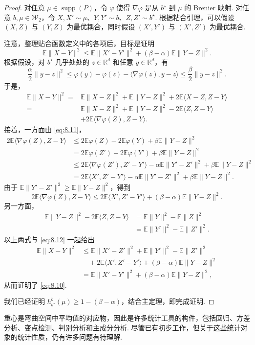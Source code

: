 \begin{proof}
对任意 $\mu\in\operatorname{supp}(P)$，令 $\varphi$ 使得 $\nabla\varphi$ 是从 $b^\star$ 到 $\mu$ 的 Brenier 映射. 对任意 $b,\mu\in\mathcal W_2$，令 $X,X'\sim\mu$、$Y,Y'\sim b$、$Z,Z'\sim b^\star$. 根据粘合引理，可以假设 $(X,Z)$ 与 $(Y,Z)$ 为最优耦合，同时假设 $(X',Y')$ 与 $(X',Z')$ 为最优耦合.

注意，整理贴合函数定义中的各项后，目标是证明
\begin{equation}\label{eq:8.10}
\mathbb E\|X-Y\|^2\le\mathbb E\|X'-Y'\|^2+(\beta-\alpha)\mathbb E\|Y-Z\|^2.
\end{equation}
根据假设，对 $b^\star$ 几乎处处的 $z\in\mathbb R^d$ 和任意 $y\in\mathbb R^d$，有
\begin{equation}\label{eq:8.11}
\frac\alpha2\|y-z\|^2
\le\varphi(y)-\varphi(z)-\langle\nabla\varphi(z),y-z\rangle
\le\frac\beta2\|y-z\|^2.
\end{equation}
于是，
\begin{equation}\label{eq:8.12}
\begin{aligned}
\mathbb E\|X-Y\|^2
={}&\mathbb E\|X-Z\|^2+\mathbb E\|Y-Z\|^2
+2\mathbb E\langle X-Z,Z-Y\rangle\\
={}&\mathbb E\|X-Z\|^2+\mathbb E\|Y-Z\|^2
-2\mathbb E\langle Z,Z-Y\rangle\\
&+2\mathbb E\langle\nabla\varphi(Z),Z-Y\rangle.
\end{aligned}
\end{equation}
接着，一方面由 \eqref{eq:8.11}，
$$\begin{aligned}
2\mathbb E\langle\nabla\varphi(Z),Z-Y\rangle
&\le2\mathbb E\varphi(Z)-2\mathbb E\varphi(Y)+\beta\mathbb E\|Y-Z\|^2\\
&=2\mathbb E\varphi(Z')-2\mathbb E\varphi(Y')+\beta\mathbb E\|Y-Z\|^2\\
&\le2\mathbb E\langle\nabla\varphi(Z'),Z'-Y'\rangle
-\alpha\mathbb E\|Y'-Z'\|^2+\beta\mathbb E\|Y-Z\|^2\\
&=2\mathbb E\langle X',Z'-Y'\rangle
-\alpha\mathbb E\|Y'-Z'\|^2+\beta\mathbb E\|Y-Z\|^2.
\end{aligned}$$
由于 $\mathbb E\|Y'-Z'\|^2\ge\mathbb E\|Y-Z\|^2$，得到
$$2\mathbb E\langle\nabla\varphi(Z),Z-Y\rangle
\le2\mathbb E\langle X',Z'-Y'\rangle+(\beta-\alpha)\mathbb E\|Y-Z\|^2.$$
另一方面，
$$\begin{aligned}
\mathbb E\|Y-Z\|^2-2\mathbb E\langle Z,Z-Y\rangle
&=\mathbb E\|Y\|^2-\mathbb E\|Z\|^2\\
&=\mathbb E\|Y'\|^2-\mathbb E\|Z'\|^2.
\end{aligned}$$
以上两式与 \eqref{eq:8.12} 一起给出
$$\begin{aligned}
\mathbb E\|X-Y\|^2
&\le\mathbb E\|X'-Z'\|^2+\mathbb E\|Y'\|^2-\mathbb E\|Z'\|^2\\
&\quad+2\mathbb E\langle X',Z'-Y'\rangle+(\beta-\alpha)\mathbb E\|Y-Z\|^2\\
&=\mathbb E\|X'-Y'\|^2+(\beta-\alpha)\mathbb E\|Y-Z\|^2,
\end{aligned}$$
从而证明了 \eqref{eq:8.10}.

我们已经证明 $h_{b^\star}^b(\mu)\ge1-(\beta-\alpha)$，结合主定理，即完成证明.
\end{proof}

重心是弯曲空间中平均值的对应物，因此是许多统计工具的构件，包括回归\cite{ref72}、方差分析\cite{ref118}、变点检测\cite{ref119}、判别分析\cite{ref134}和主成分分析\cite{ref35,ref66}. 尽管已有初步工作，但关于这些统计对象的统计性质，仍有许多问题有待理解.
